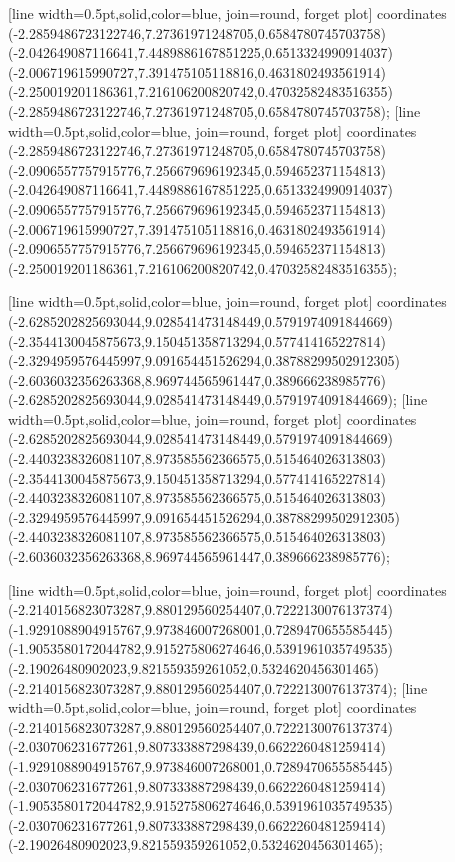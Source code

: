 [line width=0.5pt,solid,color=blue, join=round, forget plot] coordinates {(-2.2859486723122746,7.27361971248705,0.6584780745703758) (-2.042649087116641,7.4489886167851225,0.6513324990914037) (-2.006719615990727,7.391475105118816,0.4631802493561914) (-2.250019201186361,7.216106200820742,0.47032582483516355) (-2.2859486723122746,7.27361971248705,0.6584780745703758)};
[line width=0.5pt,solid,color=blue, join=round, forget plot] coordinates {(-2.2859486723122746,7.27361971248705,0.6584780745703758) (-2.0906557757915776,7.256679696192345,0.594652371154813) (-2.042649087116641,7.4489886167851225,0.6513324990914037) (-2.0906557757915776,7.256679696192345,0.594652371154813) (-2.006719615990727,7.391475105118816,0.4631802493561914) (-2.0906557757915776,7.256679696192345,0.594652371154813) (-2.250019201186361,7.216106200820742,0.47032582483516355)};

[line width=0.5pt,solid,color=blue, join=round, forget plot] coordinates {(-2.6285202825693044,9.028541473148449,0.5791974091844669) (-2.3544130045875673,9.150451358713294,0.577414165227814) (-2.3294959576445997,9.091654451526294,0.38788299502912305) (-2.6036032356263368,8.969744565961447,0.389666238985776) (-2.6285202825693044,9.028541473148449,0.5791974091844669)};
[line width=0.5pt,solid,color=blue, join=round, forget plot] coordinates {(-2.6285202825693044,9.028541473148449,0.5791974091844669) (-2.4403238326081107,8.973585562366575,0.515464026313803) (-2.3544130045875673,9.150451358713294,0.577414165227814) (-2.4403238326081107,8.973585562366575,0.515464026313803) (-2.3294959576445997,9.091654451526294,0.38788299502912305) (-2.4403238326081107,8.973585562366575,0.515464026313803) (-2.6036032356263368,8.969744565961447,0.389666238985776)};

[line width=0.5pt,solid,color=blue, join=round, forget plot] coordinates {(-2.2140156823073287,9.880129560254407,0.7222130076137374) (-1.9291088904915767,9.973846007268001,0.7289470655585445) (-1.9053580172044782,9.915275806274646,0.5391961035749535) (-2.19026480902023,9.821559359261052,0.5324620456301465) (-2.2140156823073287,9.880129560254407,0.7222130076137374)};
[line width=0.5pt,solid,color=blue, join=round, forget plot] coordinates {(-2.2140156823073287,9.880129560254407,0.7222130076137374) (-2.030706231677261,9.807333887298439,0.6622260481259414) (-1.9291088904915767,9.973846007268001,0.7289470655585445) (-2.030706231677261,9.807333887298439,0.6622260481259414) (-1.9053580172044782,9.915275806274646,0.5391961035749535) (-2.030706231677261,9.807333887298439,0.6622260481259414) (-2.19026480902023,9.821559359261052,0.5324620456301465)};

